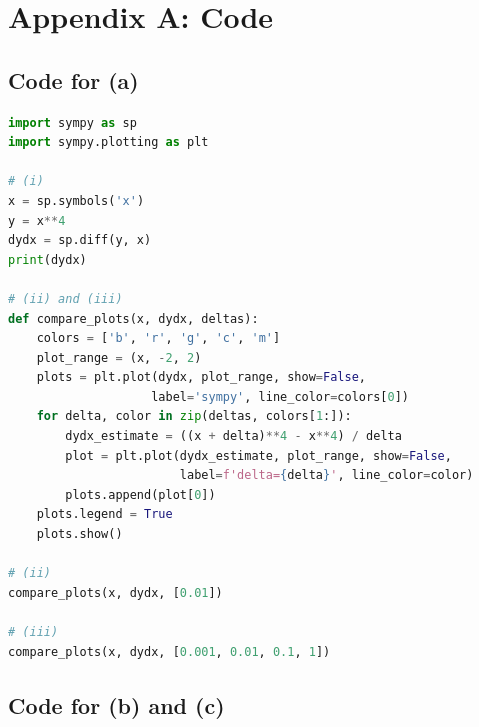 \documentclass[12pt]{article}
\begin{document}
\section*{Appendix A: Code}

\subsection*{Code for (a)}

\lstset{basicstyle=\footnotesize,xleftmargin=0in}
\begin{lstlisting}[language=Python]
import sympy as sp
import sympy.plotting as plt

# (i)
x = sp.symbols('x')
y = x**4
dydx = sp.diff(y, x)
print(dydx)

# (ii) and (iii)
def compare_plots(x, dydx, deltas):
    colors = ['b', 'r', 'g', 'c', 'm']
    plot_range = (x, -2, 2)
    plots = plt.plot(dydx, plot_range, show=False,
                    label='sympy', line_color=colors[0])
    for delta, color in zip(deltas, colors[1:]):
        dydx_estimate = ((x + delta)**4 - x**4) / delta
        plot = plt.plot(dydx_estimate, plot_range, show=False,
                        label=f'delta={delta}', line_color=color)
        plots.append(plot[0])
    plots.legend = True
    plots.show()

# (ii)
compare_plots(x, dydx, [0.01])

# (iii)
compare_plots(x, dydx, [0.001, 0.01, 0.1, 1])
\end{lstlisting}

\subsection*{Code for (b) and (c)}
\end{document}
